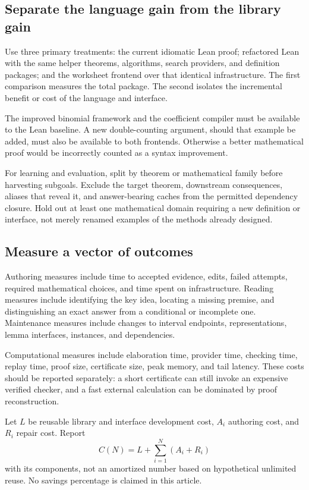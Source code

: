 \documentclass[11pt,a4paper]{article}
\theoremstyle{definition}
\begin{document}
\subsection{Separate the language gain from the library gain}
Use three primary treatments: the current idiomatic Lean proof; refactored Lean
with the same helper theorems, algorithms, search providers, and definition
packages; and the worksheet frontend over that identical infrastructure. The
first comparison measures the total package. The second isolates the incremental
benefit or cost of the language and interface.

The improved binomial framework and the coefficient compiler must be available
to the Lean baseline. A new double-counting argument, should that example be
added, must also be available to both frontends. Otherwise a better mathematical
proof would be incorrectly counted as a syntax improvement.

For learning and evaluation, split by theorem or mathematical family before
harvesting subgoals. Exclude the target theorem, downstream consequences, aliases
that reveal it, and answer-bearing caches from the permitted dependency closure.
Hold out at least one mathematical domain requiring a new definition or interface,
not merely renamed examples of the methods already designed.

\subsection{Measure a vector of outcomes}
Authoring measures include time to accepted evidence, edits, failed attempts,
required mathematical choices, and time spent on infrastructure. Reading measures
include identifying the key idea, locating a missing premise, and distinguishing
an exact answer from a conditional or incomplete one. Maintenance measures
include changes to interval endpoints, representations, lemma interfaces,
instances, and dependencies.

Computational measures include elaboration time, provider time, checking time,
replay time, proof size, certificate size, peak memory, and tail latency. These
costs should be reported separately: a short certificate can still invoke an
expensive verified checker, and a fast external calculation can be dominated
by proof reconstruction.

Let $L$ be reusable library and interface development cost, $A_i$ authoring cost,
and $R_i$ repair cost. Report
\[
 C(N)=L+\sum_{i=1}^{N}(A_i+R_i)
\]
with its components, not an amortized number based on hypothetical unlimited
reuse. No savings percentage is claimed in this article.
\end{document}

